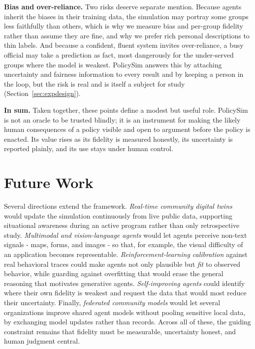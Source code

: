 \documentclass[conference]{IEEEtran}
\begin{document}
\textbf{Bias and over-reliance.} Two risks deserve separate mention. Because agents inherit the biases in their training data, the simulation may portray some groups less faithfully than others, which is why we measure bias and per-group fidelity rather than assume they are fine, and why we prefer rich personal descriptions to thin labels. And because a confident, fluent system invites over-reliance, a busy official may take a prediction as fact, most dangerously for the under-served groups where the model is weakest. PolicySim answers this by attaching uncertainty and fairness information to every result and by keeping a person in the loop, but the risk is real and is itself a subject for study (Section~\ref{sec:expdesign}).

\textbf{In sum.} Taken together, these points define a modest but useful role. PolicySim is not an oracle to be trusted blindly; it is an instrument for making the likely human consequences of a policy visible and open to argument before the policy is enacted. Its value rises as its fidelity is measured honestly, its uncertainty is reported plainly, and its use stays under human control.

\section{Future Work}

Several directions extend the framework. \emph{Real-time community digital twins} would update the simulation continuously from live public data, supporting situational awareness during an active program rather than only retrospective study. \emph{Multimodal and vision-language agents} would let agents perceive non-text signals - maps, forms, and images - so that, for example, the visual difficulty of an application becomes representable. \emph{Reinforcement-learning calibration} against real behavioral traces could make agents not only plausible but \emph{fit} to observed behavior, while guarding against overfitting that would erase the general reasoning that motivates generative agents. \emph{Self-improving agents} could identify where their own fidelity is weakest and request the data that would most reduce their uncertainty. Finally, \emph{federated community models} would let several organizations improve shared agent models without pooling sensitive local data, by exchanging model updates rather than records. Across all of these, the guiding constraint remains that fidelity must be measurable, uncertainty honest, and human judgment central.
\end{document}
